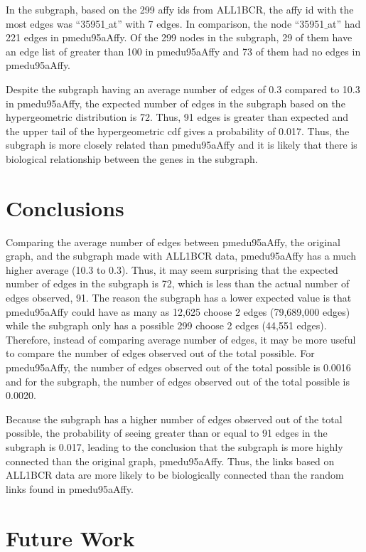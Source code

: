 \documentclass{article}[12pt]
\begin{document}
In the subgraph, based on the 299 affy ids from ALL1BCR, the affy
id with the most edges was ``35951$\_$at'' with 7 edges.  In comparison, 
the node ``35951$\_$at'' had 221 edges in pmedu95aAffy.  Of the 299 nodes 
in the subgraph, 29 of them have an edge list of greater than 100 in 
pmedu95aAffy and 73 of them had no edges in pmedu95aAffy.


Despite the subgraph having an average number of edges of 0.3 compared
to 10.3 in pmedu95aAffy, the expected number of edges in the subgraph
based on the hypergeometric distribution is 72.  Thus, 91 edges is 
greater than expected and the upper tail of the hypergeometric
cdf gives a probability of 0.017.  Thus, the subgraph is more closely
related than pmedu95aAffy and it is likely that there is biological
relationship between the genes in the subgraph.


\section*{Conclusions}
Comparing the average number of edges between pmedu95aAffy, the original 
graph, and the subgraph made with ALL1BCR data, pmedu95aAffy has a much 
higher average (10.3 to 0.3).  Thus, it may seem surprising that the
expected number of edges in the subgraph is 72, which is less than the
actual number of edges observed, 91.  The reason the subgraph has a lower
expected value is that pmedu95aAffy could have as many as 12,625 choose
2 edges (79,689,000 edges) while the subgraph only has a possible 299
choose 2 edges (44,551 edges).  Therefore, instead of comparing average
number of edges, it may be more useful to compare the number of edges 
observed out of the total possible.  For pmedu95aAffy, the number of 
edges observed out of the total possible is 0.0016 and for the subgraph, 
the number of edges observed out of the total possible is 0.0020.


Because the subgraph has a higher number of edges observed out of the 
total possible, the probability of seeing greater than or equal to 91 
edges in the subgraph is 0.017, leading to the conclusion that the 
subgraph is more highly connected than the original graph, pmedu95aAffy.  
Thus, the links based on ALL1BCR data are more likely to be biologically 
connected than the random links found in pmedu95aAffy.


\section*{Future Work}
\end{document}

